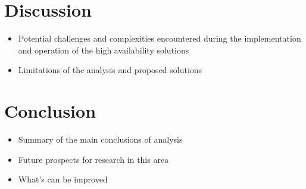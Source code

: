 \documentclass{article}
\begin{document}
\section{Discussion}
\begin{itemize}
     \item Potential challenges and complexities encountered during the implementation and operation of the high availability solutions
    \item Limitations of the analysis and proposed solutions
    
\end{itemize}

\section{Conclusion}
\begin{itemize}
    \item Summary of the main conclusions of analysis
    \item Future prospects for research in this area
    \item What's can be improved 

\end{itemize}
\end{document}
